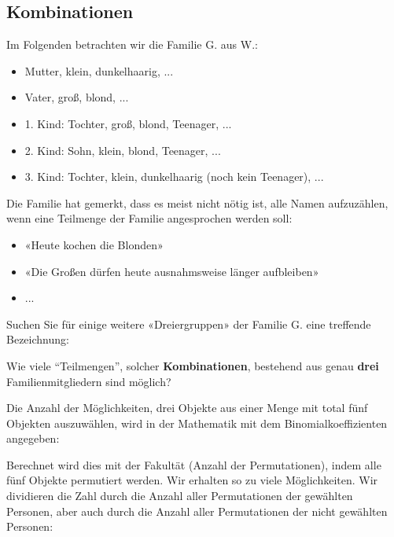 \subsection{Kombinationen}
Im Folgenden betrachten wir die Familie G. aus W.:
\begin{itemize}
\item Mutter, klein, dunkelhaarig, ...
\item Vater, groß, blond, ...
\item 1. Kind: Tochter, groß, blond, Teenager, ...
\item 2. Kind: Sohn, klein, blond, Teenager, ...
\item 3. Kind: Tochter, klein, dunkelhaarig (noch kein Teenager), ...
\end{itemize}

Die Familie hat gemerkt, dass es meist nicht nötig ist, alle Namen
aufzuzählen, wenn eine Teilmenge der Familie angesprochen werden soll:

\begin{itemize}
\item «Heute kochen die Blonden»
\item «Die Großen dürfen heute ausnahmsweise länger aufbleiben»
\item ...
\end{itemize}


Suchen Sie für einige weitere «Dreiergruppen» der Familie G. eine treffende Bezeichnung:

\newpage



Wie viele ``Teilmengen'', solcher \textbf{Kombinationen}, bestehend aus genau \textbf{drei} Familienmitgliedern sind möglich?



Die Anzahl der Möglichkeiten, drei Objekte aus einer Menge mit total
fünf Objekten auszuwählen, wird in der Mathematik mit dem
Binomialkoeffizienten angegeben:


Berechnet wird dies mit der Fakultät (Anzahl der Permutationen), indem
alle fünf Objekte permutiert werden. Wir erhalten so zu viele
Möglichkeiten. Wir dividieren die Zahl durch die Anzahl aller Permutationen der
gewählten Personen, aber auch durch die Anzahl aller Permutationen der
nicht gewählten Personen:

